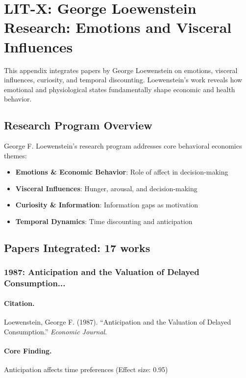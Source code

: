 \section{LIT-X: George Loewenstein Research: Emotions and Visceral Influences}
\label{app:litx}

This appendix integrates papers by George Loewenstein on emotions, visceral
influences, curiosity, and temporal discounting. Loewenstein's work reveals how emotional and
physiological states fundamentally shape economic and health behavior.

\subsection{Research Program Overview}

George F. Loewenstein's research program addresses core behavioral economics themes:

\begin{itemize}
  \item \textbf{Emotions & Economic Behavior}: Role of affect in decision-making
  \item \textbf{Visceral Influences}: Hunger, arousal, and decision-making
  \item \textbf{Curiosity & Information}: Information gaps as motivation
  \item \textbf{Temporal Dynamics}: Time discounting and anticipation
\end{itemize}

\subsection{Papers Integrated: 17 works}

\subsubsection{1987: Anticipation and the Valuation of Delayed Consumption...}

\paragraph{Citation.}
Loewenstein, George F. (1987). ``Anticipation and the Valuation of Delayed Consumption.''
\textit{Economic Journal}.

\paragraph{Core Finding.}
Anticipation affects time preferences (Effect size: 0.95)

